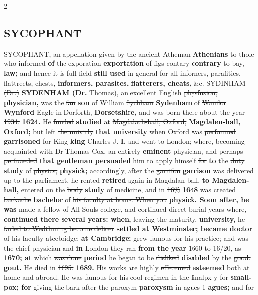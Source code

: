 \documentclass[10pt]{article}
\begin{document}
\begin{multicols}{2}
\subsection*{SYCOPHANT}
SYCOPHANT, an appellation given by the ancient \sout{Atheman} \textbf{Athenians} to thole who informed \textbf{of} the \sout{exporation} \textbf{exportation} of figs \sout{contary} \textbf{contrary} to \sout{bay,} \textbf{law;} and hence it is \sout{full field} \textbf{still used} in general for all \sout{inforners, parafities, flattreets, chests,} \textbf{informers, parasites, flatterers, cheats,} \&c. \sout{SYDINHAM (Dr.)} \textbf{SYDENHAM (Dr.} Thomas), an excellent English \sout{physfusion,} \textbf{physician,} was the \sout{fan} \textbf{son} of William \sout{Sychham} \textbf{Sydenham} of \sout{Wanilor} \textbf{Wynford} Eagle in \sout{Dorforth,} \textbf{Dorsetshire,} and was born there about the year \sout{1934.} \textbf{1624.} He \sout{funded} \textbf{studied} at \sout{Magdalach-ball, Oxford,} \textbf{Magdalen-hall, Oxford;} but left \sout{the univirly} \textbf{that university} when Oxford was \sout{performed} \textbf{garrisoned} for \sout{King} \textbf{king} Charles \sout{J.} \textbf{I.} and went to London; where, becoming acquainted with Dr Thomas Cox, an \sout{entirely} \textbf{eminent} physician, \sout{and perhaps perfuaeded} \textbf{that gentleman persuaded} him to apply himself \sout{for} \textbf{to} the \sout{duty} \textbf{study} of \sout{physics,} \textbf{physick;} accordingly, after the \sout{garrifon} \textbf{garrison} was delivered up to the parliament, he \sout{rented} \textbf{retired} again \sout{in Magdalan ball,} \textbf{to Magdalen-hall,} entered on the \sout{body} \textbf{study} of medicine, and in \sout{16\%} \textbf{1648} was created \sout{backache} \textbf{bachelor} of \sout{his faculty at home. When you} \textbf{physick. Soon after, he was} made a fellow of All-Souls college, and \sout{cortinued direct burial years where,} \textbf{continued there several years: when,} leaving the \sout{maturity,} \textbf{university,} he \sout{farled to Wedthming become delicer} \textbf{settled at Westminster; became doctor} of his faculty \sout{atcebridge;} \textbf{at Cambridge;} grew famous for his practice; and was the chief physician \sout{and} \textbf{in} London \sout{they ran} \textbf{from the year} 1660 to \sout{16/20, as} \textbf{1670; at} which \sout{was done} \textbf{period} he began to be \sout{disliked} \textbf{disabled} by the \sout{good.} \textbf{gout.} He died in \sout{1695.} \textbf{1689.} His works are highly \sout{effecemed} \textbf{esteemed} both at home and abroad. He was famous for his cool regimen in the \sout{finalpx y-for} \textbf{small-pox; for} giving the bark after the \sout{paroxym} \textbf{paroxysm} in \sout{agues 1} \textbf{agues;} and for
\end{multicols}
\end{document}
